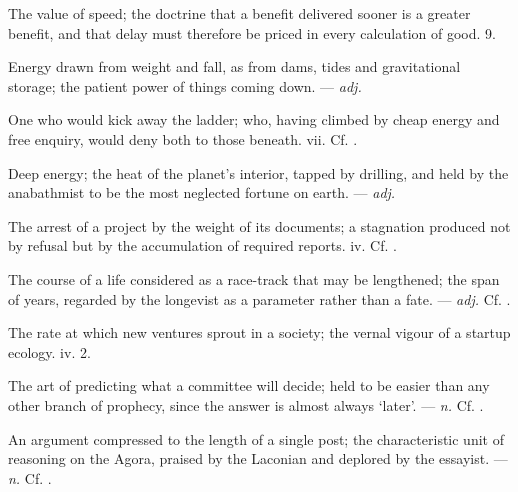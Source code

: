  The value of speed; the doctrine that a benefit delivered sooner is a greater benefit, and that delay must therefore be priced in every calculation of good.   9.

 Energy drawn from weight and fall, as from dams, tides and gravitational storage; the patient power of things coming down. ---  \textit{adj.}

 One who would kick away the ladder; who, having climbed by cheap energy and free enquiry, would deny both to those beneath.   vii. Cf. .

 Deep energy; the heat of the planet's interior, tapped by drilling, and held by the anabathmist to be the most neglected fortune on earth. ---  \textit{adj.}

 The arrest of a project by the weight of its documents; a stagnation produced not by refusal but by the accumulation of required reports.   iv. Cf. .

 The course of a life considered as a race-track that may be lengthened; the span of years, regarded by the longevist as a parameter rather than a fate. ---  \textit{adj.} Cf. .

 The rate at which new ventures sprout in a society; the vernal vigour of a startup ecology.   iv. 2.

 The art of predicting what a committee will decide; held to be easier than any other branch of prophecy, since the answer is almost always ‘later’. ---  \textit{n.} Cf. .

 An argument compressed to the length of a single post; the characteristic unit of reasoning on the Agora, praised by the Laconian and deplored by the essayist. ---  \textit{n.} Cf. .

